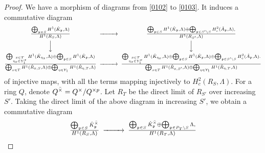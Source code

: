 \documentclass{amsart}
\theoremstyle{remark}
\numberwithin{equation}{section}
\newcommand{\ideal}[1]{\mathfrak{#1}}
\begin{document}
\begin{proof}
	We have a morphism of diagrams from \eqref{0102} to \eqref{0103}.
	It induces a commutative diagram
		\[
			\begin{CD}
					\frac{
						\bigoplus_{\ideal{p} \in S}
							H^{1}(\Hat{K}_{\ideal{p}}, \Lambda)
					}{
						H^{1}(R_{S}, \Lambda)
					}
				@>>>
					\frac{
							\bigoplus_{\ideal{p} \in S}
								H^{1}(\Hat{K}_{\ideal{p}}, \Lambda)
						\oplus
							\bigoplus_{\ideal{p} \in S' \setminus S}
								H^{2}_{c}(\Hat{A}_{\ideal{p}}, \Lambda),
					}{
						H^{1}(R_{S'}, \Lambda)
					}
				\\ @VVV @VVV \\
					\frac{
							\bigoplus_{
								\substack{
									\scriptscriptstyle
									x \in T \\
									\scriptscriptstyle
									\eta_{x} \in Y_{1}^{x}
								}
							}
								H^{1}(\Hat{K}_{\eta_{x}}, \Lambda)
						\oplus
							\bigoplus_{\ideal{p} \in S}
								H^{1}(\Hat{K}_{\ideal{p}}, \Lambda)
					}{
							\bigoplus_{x \in T}
								H^{1}(\Hat{R}_{x, S}, \Lambda)
						\oplus
							\bigoplus_{\eta \in Y_{1}}
								H^{1}(\Hat{R}_{\eta, T}, \Lambda)
					}
				@>>>
					\frac{
							\bigoplus_{
								\substack{
									\scriptscriptstyle
									x \in T \\
									\scriptscriptstyle
									\eta_{x} \in Y_{1}^{x}
								}
							}
								H^{1}(\Hat{K}_{\eta_{x}}, \Lambda)
						\oplus
							\bigoplus_{\ideal{p} \in S}
								H^{1}(\Hat{K}_{\ideal{p}}, \Lambda)
						\oplus
							\bigoplus_{\ideal{p} \in S' \setminus S}
								H^{2}_{c}(\Hat{A}_{\ideal{p}}, \Lambda).
					}{
							\bigoplus_{x \in T}
								H^{1}(\Hat{R}_{x, S'}, \Lambda)
						\oplus
							\bigoplus_{\eta \in Y_{1}}
								H^{1}(\Hat{R}_{\eta, T}, \Lambda)
					}
			\end{CD}
		\]
	of injective maps, with all the terms mapping injectively to
	$H^{2}_{c}(R_{S}, \Lambda)$.
	For a ring $Q$, denote $Q^{\Bar{\times}} = Q^{\times} / Q^{\times p}$.
	Let $R_{T}$ be the direct limit of $R_{S'}$ over increasing $S'$.
	Taking the direct limit of the above diagram in increasing $S'$,
	we obtain a commutative diagram
		\[
			\begin{CD}
					\frac{
						\bigoplus_{\ideal{p} \in S}
							\Hat{K}_{\ideal{p}}^{\Bar{\times}}
					}{
						H^{1}(R_{S}, \Lambda)
					}
				@>>>
					\frac{
							\bigoplus_{\ideal{p} \in S}
								\Hat{K}_{\ideal{p}}^{\Bar{\times}}
						\oplus
							\bigoplus_{\ideal{p} \in P_{T} \setminus S}
								\Lambda,
					}{
						H^{1}(R_{T}, \Lambda)
}
\end{CD}\]
\end{proof}
\end{document}
